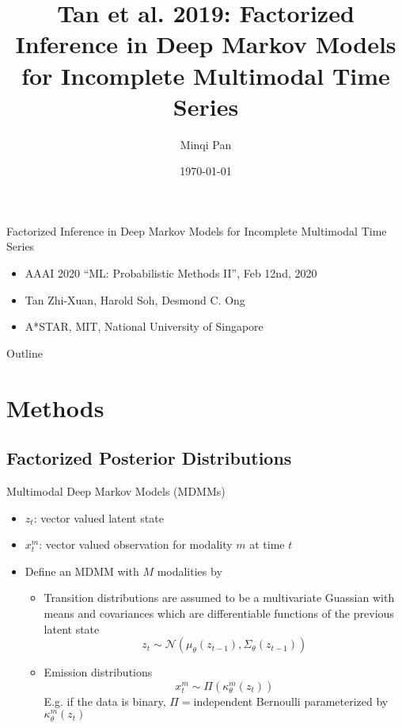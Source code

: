 \documentclass{beamer}
\title[Tan et al. 2019: Factorized Inference in DMM for IMTS]{Tan et al. 2019: Factorized Inference in Deep Markov Models for Incomplete Multimodal Time Series}
\author{Minqi Pan}
\date{\today}
\begin{document}
\begin{frame}
  \titlepage
\end{frame}

\begin{frame}{Factorized Inference in Deep Markov Models for Incomplete Multimodal Time Series}
\begin{itemize}
\item AAAI 2020 ``ML: Probabilistic Methods II'', Feb 12nd, 2020
\item Tan Zhi-Xuan, Harold Soh, Desmond C. Ong
\item A*STAR, MIT, National University of Singapore
\end{itemize}
\end{frame}

\begin{frame}{Outline}
  \tableofcontents
\end{frame}

\section{Methods}
\subsection{Factorized Posterior Distributions}
\begin{frame}{Multimodal Deep Markov Models (MDMMs)}
\begin{itemize}
\item $z_t$: vector valued latent state
\item $x_t^m$: vector valued observation for modality $m$ at time $t$
\item Define an MDMM with $M$ modalities by
\begin{itemize}
\item Transition distributions are assumed to be a multivariate Guassian with means and covariances which are differentiable functions of the previous latent state\[
z_t\sim\mathcal{N}(\mu_\theta(z_{t-1}),\Sigma_\theta(z_{t-1}))
\]
\item Emission distributions\[
x_t^m\sim\Pi(\kappa_\theta^m(z_t))
\]E.g. if the data is binary, $\Pi=$independent Bernoulli parameterized by $\kappa_\theta^m(z_t)$
\end{itemize}
\end{itemize}
\end{frame}
\end{document}
